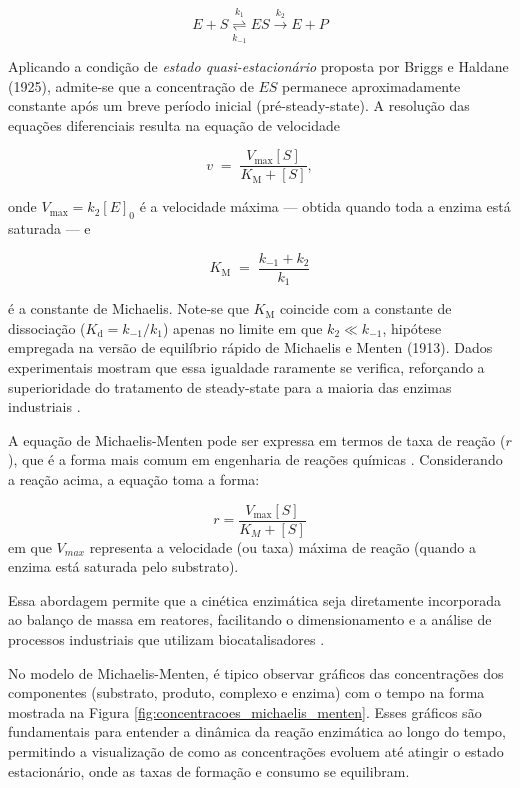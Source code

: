 \documentclass[12pt,oneside]{report}
\begin{document}
\begin{equation}
    \label{eq:MM-mecanismo}
    E + S \overset{k_1}{\underset{k_{-1}}{\rightleftharpoons}} ES \xrightarrow{k_2} E + P
\end{equation}

Aplicando a condição de \emph{estado quasi-estacionário} proposta por Briggs e Haldane (1925), admite-se que a concentração de $ES$ permanece aproximadamente constante após um breve período inicial (pré-steady-state). A resolução das equações diferenciais resulta na equação de velocidade

\begin{equation}
    \label{eq:MM-equacao}
    v \;=\; \frac{V_{\mathrm{max}}[S]}{K_\mathrm{M} + [S]},
\end{equation}

onde $V_{\mathrm{max}} = k_{2}[E]_0$ é a velocidade máxima — obtida quando toda a enzima está saturada — e

\[
    K_\mathrm{M} \;=\; \frac{k_{-1}+k_{2}}{k_{1}}
\]

é a constante de Michaelis. Note-se que $K_\mathrm{M}$ coincide com a constante de dissociação ($K_\mathrm{d} = k_{-1}/k_{1}$) apenas no limite em que $k_{2}\!\ll\!k_{-1}$, hipótese empregada na versão de equilíbrio rápido de Michaelis e Menten (1913). Dados experimentais mostram que essa igualdade raramente se verifica, reforçando a superioridade do tratamento de steady-state para a maioria das enzimas industriais \cite{bisswanger2017}.

A equação de Michaelis-Menten pode ser expressa em termos de taxa de reação ($r$), que é a forma mais comum em engenharia de reações químicas \cite{FOGLER_2016}. Considerando a reação acima, a equação toma a forma:

\begin{equation}
    r = \frac{V_{\text{max}} [S]}{K_M + [S]}
\end{equation}
em que $V_{max}$ representa a velocidade (ou taxa) máxima de reação (quando a enzima está saturada pelo substrato).

Essa abordagem permite que a cinética enzimática seja diretamente incorporada ao balanço de massa em reatores, facilitando o dimensionamento e a análise de processos industriais que utilizam biocatalisadores \cite{FOGLER_2016}.

No modelo de Michaelis-Menten, é tipico observar gráficos das concentrações dos componentes (substrato, produto, complexo e enzima) com o tempo na forma mostrada na Figura \ref{fig:concentracoes_michaelis_menten}. Esses gráficos são fundamentais para entender a dinâmica da reação enzimática ao longo do tempo, permitindo a visualização de como as concentrações evoluem até atingir o estado estacionário, onde as taxas de formação e consumo se equilibram.
\end{document}
